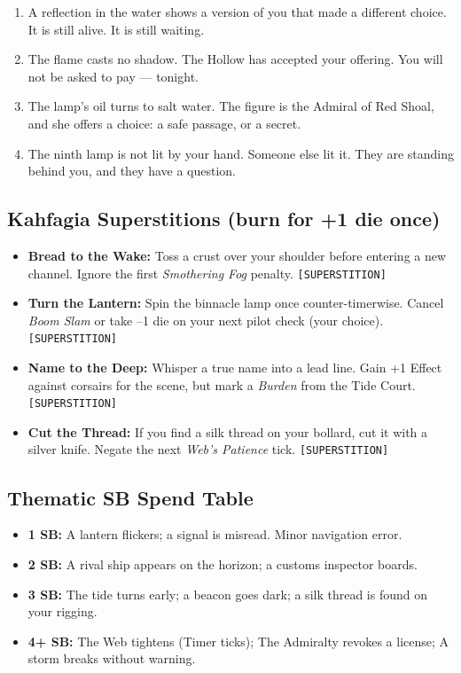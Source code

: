 \begin{itemize}
\begin{enumerate}
      \item A reflection in the water shows a version of you that made a different choice. It is still alive. It is still waiting.
      \item The flame casts no shadow. The Hollow has accepted your offering. You will not be asked to pay --- tonight.
      \item The lamp's oil turns to salt water. The figure is the Admiral of Red Shoal, and she offers a choice: a safe passage, or a secret.
      \item The ninth lamp is not lit by your hand. Someone else lit it. They are standing behind you, and they have a question.
    \end{enumerate}
\end{itemize}

\subsection*{Kahfagia Superstitions (burn for +1 die once)}
\begin{itemize}
  \item \textbf{Bread to the Wake:} Toss a crust over your shoulder before entering a new channel. Ignore the first \emph{Smothering Fog} penalty. \texttt{[SUPERSTITION]}
  \item \textbf{Turn the Lantern:} Spin the binnacle lamp once counter-timerwise. Cancel \emph{Boom Slam} or take --1 die on your next pilot check (your choice). \texttt{[SUPERSTITION]}
  \item \textbf{Name to the Deep:} Whisper a true name into a lead line. Gain +1 Effect against corsairs for the scene, but mark a \emph{Burden} from the Tide Court. \texttt{[SUPERSTITION]}
  \item \textbf{Cut the Thread:} If you find a silk thread on your bollard, cut it with a silver knife. Negate the next \emph{Web's Patience} tick. \texttt{[SUPERSTITION]}
\end{itemize}

\subsection*{Thematic SB Spend Table}
\label{sec:kahfagia-sb}

\begin{itemize}
\item \textbf{1 SB:} A lantern flickers; a signal is misread. Minor navigation error.
\item \textbf{2 SB:} A rival ship appears on the horizon; a customs inspector boards.
\item \textbf{3 SB:} The tide turns early; a beacon goes dark; a silk thread is found on your rigging.
\item \textbf{4+ SB:} The Web tightens (Timer ticks); The Admiralty revokes a license; A storm breaks without warning.
\end{itemize}

